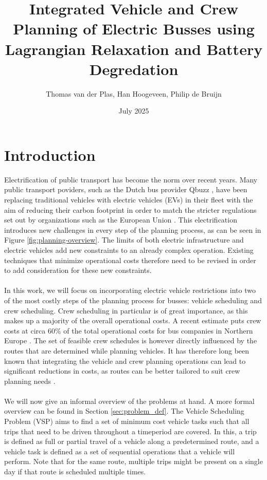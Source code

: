 \documentclass[ht]{article}
\title{Integrated Vehicle and Crew Planning of Electric Busses using Lagrangian Relaxation and Battery Degredation}
\date{July 2025}
\author{Thomas van der Plas, Han Hoogeveen, Philip de Bruijn}
\begin{document}
\maketitle

\section{Introduction}
Electrification of public transport has become the norm over recent years. Many public transport poviders, such as the Dutch bus provider Qbuzz \cite{qbuzzQbuzz}, have been replacing traditional vehicles with electric vehicles (EVs) in their fleet with the aim of reducing their carbon footprint in order to match the stricter regulations set out by organizations such as the European Union \cite{europaRegulation20181999}. This electrification introduces new challenges in every step of the planning process, as can be seen in Figure \ref{fig:planning-overview}. The limits of both electric infrastructure and electric vehicles add new constraints to an already complex operation. Existing techniques that minimize operational costs therefore need to be revised in order to add consideration for these new constraints. \\\\
In this work, we will focus on incorporating electric vehicle restrictions into two of the most costly steps of the planning process for busses: vehicle scheduling and crew scheduling. Crew scheduling in particular is of great importance, as this makes up a majority of the overall operational costs. A recent estimate puts crew costs at circa $60\%$ of the total operational costs for bus companies in Northern Europe \cite{Perumal2019Crew}. The set of feasible crew schedules is however directly influenced by the routes that are determined while planning vehicles. It has therefore long been known that integrating the vehicle and crew planning operations can lead to significant reductions in costs, as routes can be better tailored to suit crew planning needs \cite{Bodin1983}. \\\\
We will now give an informal overview of the problems at hand. A more formal overview can be found in Section \ref{sec:problem_def}. 
The Vehicle Scheduling Problem (VSP) aims to find a set of minimum cost vehicle tasks such that all trips that need to be driven throughout a timeperiod are covered. In this, a trip is defined as full or partial travel of a vehicle along a predetermined route, and a vehicle task is defined as a set of sequential operations that a vehicle will perform. Note that for the same route, multiple trips might be present on a single day if that route is scheduled multiple times. \\
\end{document}
